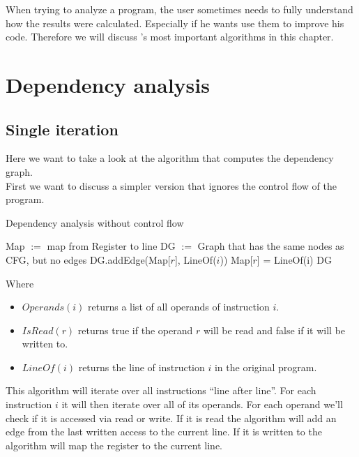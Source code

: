 When trying to analyze a program, the user sometimes needs to fully understand how the results were calculated. Especially if he wants use them to improve his code. Therefore we will discuss \suaca's most important algorithms in this chapter.

\section{Dependency analysis}
\label{sec:depanalysis}

\subsection{Single iteration}

Here we want to take a look at the algorithm that computes the dependency graph. \\
First we want to discuss a simpler version that ignores the control flow of the program.

\begin{algorithm}[H]
    \SetAlgoLined
    \caption{Dependency analysis without control flow}
    \label{alg:depsingle}
    Map $:=$ map from Register to line\;
    DG $:=$ Graph that has the same nodes as CFG, but no edges\;
     {
          {
              {
                 DG.addEdge(Map[$r$], LineOf($i$))\;
             }{
                Map[$r$] = LineOf(i)\;
            }
        }
    }
    \Return DG\;
\end{algorithm}

\newpage

Where
\begin{itemize}
    \item $Operands(i)$ returns a list of all operands of instruction $i$.
    \item $IsRead(r)$ returns true if the operand $r$ will be read and false if it will be written to.
    \item $LineOf(i)$ returns the line of instruction $i$ in the original program.
\end{itemize}

This algorithm will iterate over all instructions ``line after line''. For each instruction $i$ it will then iterate over all of its operands. For each operand we'll check if it is accessed via read or write. If it is read the algorithm will add an edge from the last written access to the current line. If it is written to the algorithm will map the register to the current line.\\

